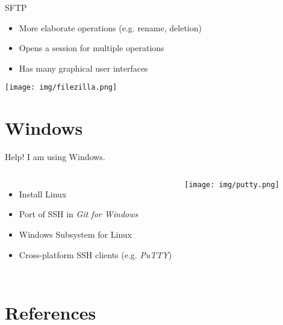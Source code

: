 \documentclass[10pt,graphics,aspectratio=169,table]{beamer}
\begin{document}
\begin{frame}[fragile]{SFTP}
	\begin{itemize}
		\item More elaborate operations (e.g. rename, deletion)
		\item Opens a session for multiple operations
		\item Has many graphical user interfaces
	\end{itemize}
	\begin{center}
		\texttt{[image: img/filezilla.png]} \cite{filezilla}
	\end{center}
\end{frame}

\section{Windows}
\begin{frame}[fragile]{Help! I am using Windows.}
\begin{columns}
	\begin{itemize}
		\item Install Linux
		\item Port of SSH in \textit{Git for Windows}
		\item Windows Subsystem for Linux
		\item Cross-platform SSH clients (e.g. \textit{PuTTY})
	\end{itemize}
	\texttt{[image: img/putty.png]} \cite{putty}
\end{columns}
\end{frame}

\section{References}
\begin{frame}[allowframebreaks]
	\printbibliography[heading=none]
\end{frame}
\end{document}
